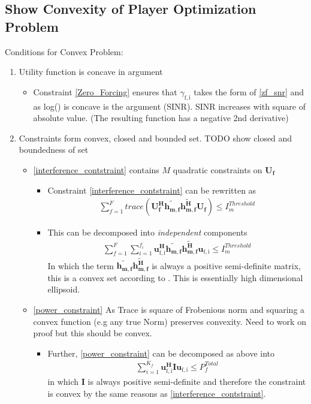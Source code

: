 \documentclass[12pt]{article}
\begin{document}
\subsection{Show Convexity of Player Optimization Problem}

Conditions for Convex Problem:

\begin{enumerate}
\item Utility function is concave in argument 
\begin{itemize}
\item Constraint \eqref{Zero_Forcing} ensures that $\gamma_{\mathrm{f,i}}$ takes the form of \eqref{zf_snr} and  as log() is concave is the argument (SINR). SINR increases with square of absolute value. (The resulting function has a negative 2nd derivative)

\end{itemize}

\item Constraints form convex, closed and bounded set. TODO show closed and boundedness of set

\begin{itemize}

\item\eqref{interference_contstraint} contains $M$ quadratic constraints on $\mathbf{U_f}$
\begin{itemize}
\item Constraint \eqref{interference_contstraint} can be rewritten as 
\begin{gather}
\sum_{f=1}^F
trace(\mathbf{U_f^H} \mathbf{\tilde{h_{m,f}}} \mathbf{\tilde{h_{m,f}^H}} \mathbf{U_f} )\leq I^{Threshold}_{m}
\end{gather}
\item This can be decomposed into \textit{independent} components 
\begin{gather}
\sum_{f=1}^F
\sum_{i=1}^{f_i}
\mathbf{u_{\mathrm{f,i}}^H} \mathbf{\tilde{h_{m,f}}} \mathbf{\tilde{h_{m,f}^H}} \mathbf{u_{\mathrm{f,i}}} \leq I^{Threshold}_{m}
\end{gather}
In which the term $ \mathbf{\tilde{h_{m,f}}} \mathbf{\tilde{h_{m,f}^H}}$ is always a positive semi-definite matrix, this is a convex set according to 
\cite[p.8,9]{BoV:04}. This is essentially high dimensional ellipsoid.


\end{itemize}

\item\eqref{power_constraint} As Trace is square of Frobenious norm and squaring a convex function (e.g any true Norm) preserves convexity.
Need to work on proof but this should be convex.
\begin{itemize}
\item Further, \eqref{power_constraint} can be decomposed as above into
\begin{gather}
\sum_{i=1}^{K_f}\mathbf{u_{\mathrm{f,i}}^H} \mathbf{I} \mathbf{u_{\mathrm{f,i}}} \leq  P^{Total}_{f}
\end{gather}
in which $\mathbf{I}$ is always positive semi-definite and therefore the constraint is convex by the same reasons as \eqref{interference_contstraint}.
\end{itemize}


\end{itemize}
\end{enumerate}
\end{document}
